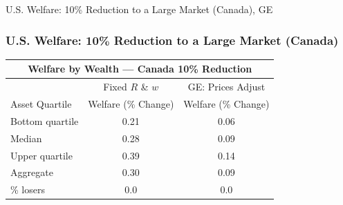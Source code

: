 \documentclass[9pt,pdftex,aspectratio=1610]{beamer}
\theoremstyle{definition}
\begin{document}
\begin{frame}[t]{U.S. Welfare: 10\% Reduction to a Large Market (Canada), {\color{red} GE } }
\vspace{-.5cm}
\begin{figure}[!t]
\end{figure}
\end{frame}


\begin{frame}[t]
\frametitle{U.S. Welfare: 10\% Reduction to a Large Market (Canada)}
\begin{table}[!t]
\footnotesize
\setlength {\tabcolsep}{6.05mm}
\renewcommand{\arraystretch}{1.80}
\begin{center}
\begin{tabular}{l c c}
\multicolumn{3}{c}{\small \textbf{Welfare by Wealth --- Canada {\color{red} 10\%} Reduction}}\\
\hline
\hline
& \footnotesize  Fixed $R$ \& $w$ & GE: Prices Adjust \\
\cmidrule(lr){2-2}  \cmidrule(lr){3-3}
\footnotesize  Asset Quartile & \footnotesize  Welfare (\% Change) & \footnotesize  Welfare (\% Change) \\
\footnotesize  Bottom quartile  & 0.21 & 0.06 \\
\footnotesize  Median & 0.28 & 0.09 \\
\footnotesize  Upper quartile  & 0.39 & 0.14  \\
\footnotesize  Aggregate & 0.30 &  0.09 \\
\cmidrule(lr){2-2}  \cmidrule(lr){3-3}
\footnotesize  \% losers & 0.0 & 0.0\\
\hline
\end{tabular}
\end{center}
\end{table}
\end{frame}
\end{document}
